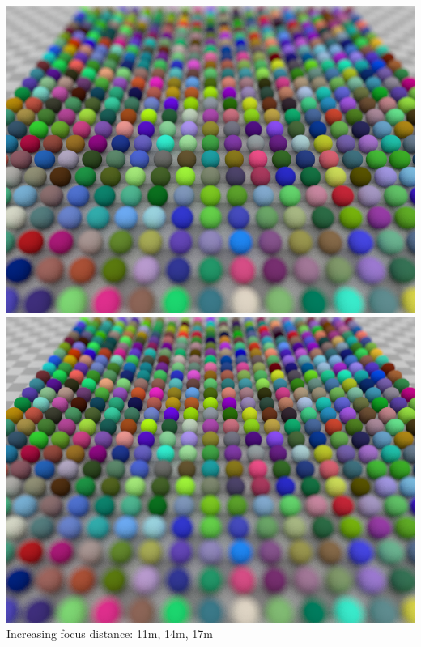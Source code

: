 \documentclass[utf8,stillsansserifmath,fleqn,t]{beamer}
\begin{document}
\begin{frame}[label=dof-results]
\includegraphics[width=.32\textwidth]{./fig/pathtracer-result-15-3.png}\hfill
\includegraphics[width=.32\textwidth]{./fig/pathtracer-result-15-5.png}\\
Increasing focus distance: 11m, 14m, 17m
\end{frame}
\end{document}
